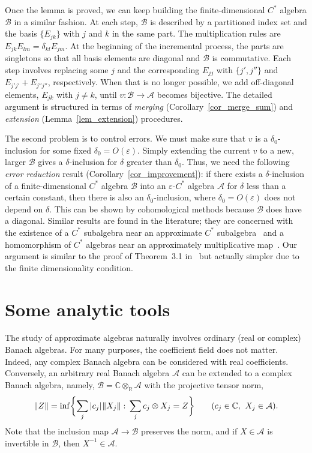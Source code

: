 \documentclass[12pt]{article}
\newcommand{\RR}{\mathbb{R}}
\newcommand{\CC}{\mathbb{C}}
\newcommand{\calA}{\mathcal{A}}
\newcommand{\calB}{\mathcal{B}}
\newcommand{\ts}{\mkern1mu}
\newcommand{\eps}{\varepsilon}
\newtheorem[definition]{Definition}[Theorem]{Definition}
\newtheorem[remark]{Example}[Theorem]{Example}
\newtheorem[remark]{Remark}[Theorem]{Remark}
\newtheorem[remark]{Question}[Theorem]{Open question}
\newtheorem*[definition]{definition}{Definition}
\newtheorem*[remark]{example}{Example}
\newtheorem*[remark]{remark}{Remark}
\newtheorem*[remark]{question}{Open question}
\numberwithin{equation}{section}
\begin{document}
Once the lemma is proved, we can keep building the finite-dimensional $C^*$ algebra $\calB$ in a similar fashion. At each step, $\calB$ is described by a partitioned index set and the basis $\{E_{jk}\}$ with $j$ and $k$ in the same part. The multiplication rules are $E_{jk}E_{lm}=\delta_{kl}E_{jm}$. At the beginning of the incremental process, the parts are singletons so that all basis elements are diagonal and $\calB$ is commutative. Each step involves replacing some $j$ and the corresponding $E_{jj}$ with $\{j',j''\}$ and $E_{j'j'}+E_{j''j''}$, respectively. When that is no longer possible, we add off-diagonal elements, $E_{jk}$ with $j\not=k$, until $v\colon \calB\to\calA$ becomes bijective. The detailed argument is structured in terms of \emph{merging} (Corollary~\ref{cor_merge_sum}) and \emph{extension} (Lemma~\ref{lem_extension}) procedures.

The second problem is to control errors. We must make sure that $v$ is a $\delta_0$-inclusion for some fixed $\delta_0=O(\eps)$. Simply extending the current $v$ to a new, larger $\calB$ gives a $\delta$-inclusion for $\delta$ greater than $\delta_0$. Thus, we need the following \emph{error reduction} result (Corollary~\ref{cor_improvement}): if there exists a $\delta$-inclusion of a finite-dimensional $C^*$ algebra $\calB$ into an $\eps$-$C^*$ algebra $\calA$ for $\delta$ less than a certain constant, then there is also an $\delta_0$-inclusion, where $\delta_0=O(\eps)$ does not depend on $\delta$. This can be shown by cohomological methods because $\calB$ does have a diagonal. Similar results are found in the literature; they are concerned with the existence of a $C^*$ subalgebra near an approximate $C^*$ subalgebra~\cite{Chr80} and a homomorphism of $C^*$ algebras near an approximately multiplicative map~\cite{Joh88}. Our argument is similar to the proof of Theorem~3.1 in~\cite{Joh88} but actually simpler due to the finite dimensionality condition.


\section{Some analytic tools}

The study of approximate algebras naturally involves ordinary (real or complex) Banach algebras. For many purposes, the coefficient field does not matter. Indeed, any complex Banach algebra can be considered with real coefficients. Conversely, an arbitrary real Banach algebra $\calA$ can be extended to a complex Banach algebra, namely, $\calB=\CC\otimes_\RR\calA$ with the projective tensor norm,
\begin{equation}
\|Z\|=\inf\biggl\{\sum_{j}|c_j|\ts\|X_j\|:\,
\sum_{j}c_j\otimes X_j=Z\biggr\}\qquad
(c_j\in\CC,\,\: X_j\in\calA).
\end{equation}
Note that the inclusion map $\calA\to\calB$ preserves the norm, and if $X\in\calA$ is invertible in $\calB$, then $X^{-1}\in\calA$.
\end{document}
